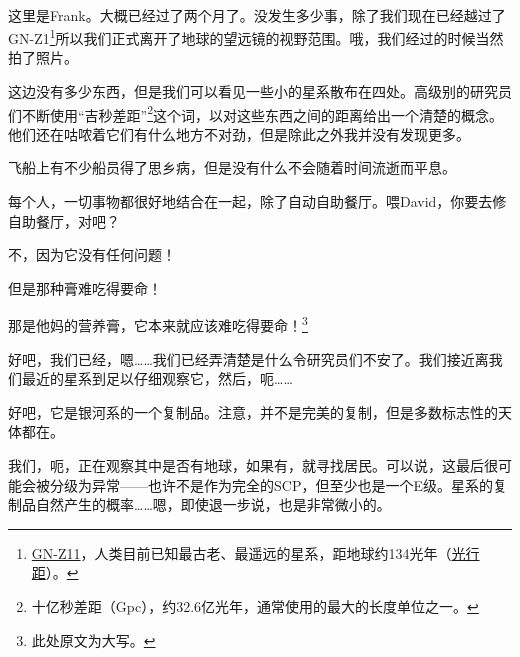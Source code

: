 \hr

\begin{scpbox}

\\
这里是Frank。大概已经过了两个月了。没发生多少事，除了我们现在已经越过了GN-Z1\footnote{\hyperref[chap:]{GN-Z11}，人类目前已知最古老、最遥远的星系，距地球约134光年（\hyperref[chap:]{光行距}）。}所以我们正式离开了地球的望远镜的视野范围。哦，我们经过的时候当然拍了照片。

这边没有多少东西，但是我们可以看见一些小的星系散布在四处。高级别的研究员们不断使用“吉秒差距”\footnote{十亿秒差距（Gpc），约32.6亿光年，通常使用的最大的长度单位之一。}这个词，以对这些东西之间的距离给出一个清楚的概念。他们还在咕哝着它们有什么地方不对劲，但是除此之外我并没有发现更多。

飞船上有不少船员得了思乡病，但是没有什么不会随着时间流逝而平息。

每个人，一切事物都很好地结合在一起，除了自动自助餐厅。喂David，你要去修自助餐厅，对吧？

不，因为它没有任何问题！

但是那种膏难吃得要命！

那是他妈的营养膏，它本来就应该难吃得要命！\footnote{此处原文为大写。}

\end{scpbox}

\hr

\begin{scpbox}


好吧，我们已经，嗯……我们已经弄清楚是什么令研究员们不安了。我们接近离我们最近的星系到足以仔细观察它，然后，呃……

好吧，它是银河系的一个复制品。注意，并不是完美的复制，但是多数标志性的天体都在。

我们，呃，正在观察其中是否有地球，如果有，就寻找居民。可以说，这最后很可能会被分级为异常——也许不是作为完全的SCP，但至少也是一个E级。星系的复制品自然产生的概率……嗯，即使退一步说，也是非常微小的。


\end{scpbox}

\hr

